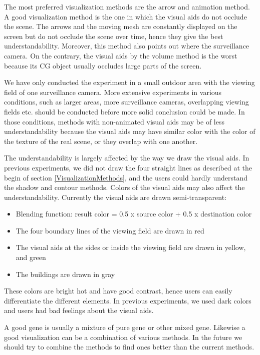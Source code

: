 The most preferred visualization methods are the arrow and animation method. A good visualization method is the one in which the visual aids do not occlude the scene. The arrows and the moving mesh are constantly displayed on the screen but do not occlude the scene over time, hence they give the best understandability. Moreover, this method also points out where the surveillance camera. On the contrary, the visual aids by the volume method is the worst because its CG object usually occludes large parts of the screen.

We have only conducted the experiment in a small outdoor area with the viewing field of one surveillance camera. More extensive experiments in various conditions, such as larger areas, more surveillance cameras, overlapping viewing fields etc. should be conducted before more solid conclusion could be made. In those conditions, methods with non-animated visual aids may be of less understandability because the visual aids may have similar color with the color of the texture of the real scene, or they overlap with one another.

The understandability is largely affected by the way we draw the visual aids. In previous experiments, we did not draw the four straight lines as described at the begin of section \ref{VisualizationMethods}, and the users could hardly understand the shadow and contour methods. Colors of the visual aids may also affect the understandability. Currently the visual aids are drawn semi-transparent:

\begin{itemize}
	\item Blending function: result color = 0.5 x source color + 0.5 x destination color
	\item The four boundary lines of the viewing field are drawn in red
	\item The visual aids at the sides or inside the viewing field are drawn in yellow, and green
	\item The buildings are drawn in gray
\end{itemize}

These colors are bright hot and have good contrast, hence users can easily differentiate the different elements. In previous experiments, we used dark colors and users had bad feelings about the visual aids.

A good gene is usually a mixture of pure gene or other mixed gene. Likewise a good visualization can be a combination of various methods. In the future we should try to combine the methods to find ones better than the current methods.
